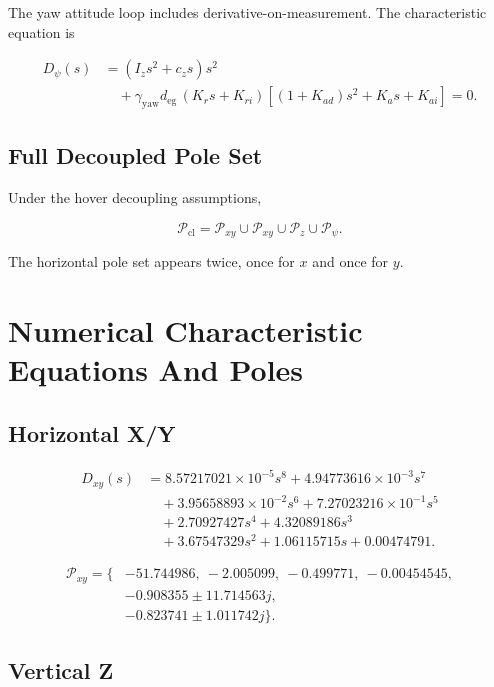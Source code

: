 \documentclass[11pt]{article}
\newcommand{\degc}{d_{\mathrm{eg}}}
\newcommand{\gammay}{\gamma_{\mathrm{yaw}}}
\begin{document}
The yaw attitude loop includes derivative-on-measurement. The characteristic
equation is

\[
\boxed{
\begin{aligned}
D_{\psi}(s)
&=
(I_zs^2+c_zs)s^2\\
&\quad
+\gammay\degc\,(K_rs+K_{ri})
\left[(1+K_{ad})s^2+K_as+K_{ai}\right]=0.
\end{aligned}
}
\]

\subsection{Full Decoupled Pole Set}

Under the hover decoupling assumptions,

\[
\boxed{
\mathcal{P}_{\mathrm{cl}}
=
\mathcal{P}_{xy}
\cup
\mathcal{P}_{xy}
\cup
\mathcal{P}_{z}
\cup
\mathcal{P}_{\psi}.
}
\]

The horizontal pole set appears twice, once for \(x\) and once for \(y\).

\section{Numerical Characteristic Equations And Poles}

\subsection{Horizontal X/Y}

\[
\begin{aligned}
D_{xy}(s)
&=
8.57217021{\times}10^{-5}s^8
+4.94773616{\times}10^{-3}s^7\\
&\quad
+3.95658893{\times}10^{-2}s^6
+7.27023216{\times}10^{-1}s^5\\
&\quad
+2.70927427s^4
+4.32089186s^3\\
&\quad
+3.67547329s^2
+1.06115715s
+0.00474791.
\end{aligned}
\]

\[
\boxed{
\begin{aligned}
\mathcal{P}_{xy}=\{&
-51.744986,\ -2.005099,\ -0.499771,\ -0.00454545,\\
&-0.908355\pm 11.714563j,\\
&-0.823741\pm 1.011742j\}.
\end{aligned}
}
\]

\subsection{Vertical Z}
\end{document}
